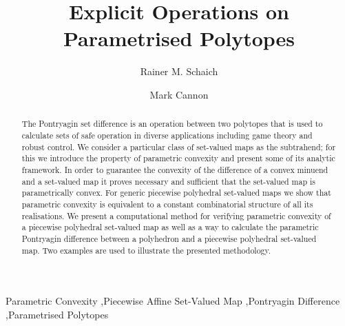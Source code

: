\documentclass[final]{elsarticle}
\theoremstyle{remark}
\theoremstyle{definition}
\begin{document}
\begin{frontmatter}

\title{Explicit Operations on Parametrised Polytopes}

\author{Rainer M. Schaich}


\author{Mark Cannon}


\address{Department of Engineering Science, University of Oxford, Oxford,  OX1 3PJ, UK}


\begin{abstract}
The Pontryagin set difference is an operation between two polytopes that is used to calculate sets of safe operation in diverse applications including game theory and robust control.
%
We consider a particular class of set-valued maps as the subtrahend; for this we introduce the property of parametric convexity and present some of its analytic framework.
%
In order to guarantee the convexity of the difference of a convex minuend and a set-valued map it proves necessary and sufficient that the set-valued map is parametrically convex.
%
For generic piecewise polyhedral set-valued maps we show that parametric convexity is equivalent to a constant combinatorial structure of all its realisations.
%
We present a computational method for verifying parametric convexity of a piecewise polyhedral set-valued map as well as a way to calculate the parametric Pontryagin difference between a polyhedron and a piecewise polyhedral set-valued map.
%
Two examples are used to illustrate the presented methodology.
\end{abstract}

\begin{keyword}
Parametric Convexity \sep Piecewise Affine Set-Valued Map \sep Pontryagin Difference \sep Parametrised Polytopes
\end{keyword}

\end{frontmatter}

\end{document}

